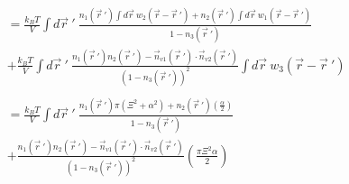 \documentclass[double,12pt]{beavtex}
\begin{document}
\begin{align} %
          &= \frac{k_BT}{V} \int d\vec r~'~ \frac{n_1(\vec r~')\int d \vec r
           ~w_2(\vec r - \vec r~')
          +n_2(\vec r~')\int d \vec r ~w_1(\vec r - \vec r~')}
          {1-n_3(\vec r~')} \nonumber\\
          &+\frac{k_BT}{V} \int d\vec r~'~\frac{n_1(\vec r~')n_2(\vec r~')
          -\vec n_{v1}(\vec r~')
          \cdot \vec n_{v2}(\vec r~')}{(1-n_3(\vec r~'))^2} \int d \vec r 
          ~w_3(\vec r - \vec r~') \\ \nonumber \\
%
           &= \frac{k_BT}{V}\int d\vec r~'~ \frac{n_1(\vec r~')
           \pi(\Xi^2 + \alpha^2)
          +n_2(\vec r~')\left(\frac{\alpha}{2}\right)}{1-n_3(\vec r~')} 
          \nonumber \\
          &+ \frac{n_1(\vec r~')n_2(\vec r~')
          -\vec n_{v1}(\vec r~')
          \cdot \vec n_{v2}(\vec r~')}{(1-n_3(\vec r~'))^2}
          \left(\frac{\pi\Xi^2\alpha}{2}\right)   
\end{align}
\end{document}
